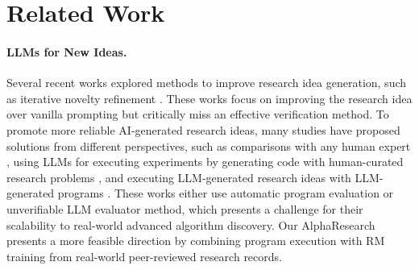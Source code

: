 

\section{Related Work}
\paragraph{LLMs for New Ideas.}
Several recent works explored methods to improve research idea generation, such as iterative novelty refinement \citep{wang2024scimon, Baek2024ResearchAgentIR}. These works focus on improving the research idea over vanilla prompting but critically miss an effective verification method. To promote more reliable AI-generated research ideas, many studies have proposed solutions from different perspectives, such as comparisons with any human expert \citep{si2024can}, using LLMs for executing experiments by generating code with human-curated research problems \citep{Huang2023MLAgentBenchEL, Tian2024SciCodeAR}, and executing LLM-generated research ideas with LLM-generated programs \citep{Li2024MLRCopilotAM, lu2024ai, aygun2025ai}. These works either use automatic program evaluation or unverifiable LLM evaluator method, which presents a challenge for their scalability to real-world advanced algorithm discovery. 
Our AlphaResearch presents a more feasible direction by combining program execution with RM training from real-world peer-reviewed research records.

